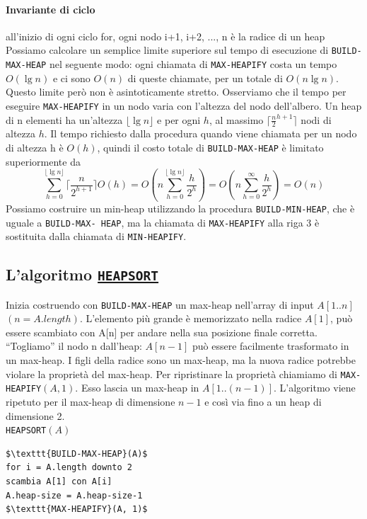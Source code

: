 \documentclass[11pt,a4paper]{article}
\begin{document}
\paragraph{Invariante di ciclo} all’inizio di ogni ciclo for, ogni nodo i+1, i+2, ..., n è la radice
di un heap\medskip\\
%
Possiamo calcolare un semplice limite superiore sul tempo di esecuzione di \texttt{BUILD-MAX-HEAP} nel seguente
modo: ogni chiamata di \texttt{MAX-HEAPIFY} costa un tempo $O(\lg n)$ e ci sono $O(n)$ di queste chiamate, per un totale
di $O(n \lg n)$. Questo limite però non è asintoticamente stretto.
Osserviamo che il tempo per eseguire \texttt{MAX-HEAPIFY} in un nodo varia con l’altezza del nodo dell’albero. Un
heap di n elementi ha un’altezza $\lfloor\lg n\rfloor$ e per ogni $h$, al massimo $\lceil \frac{n}{2}^{h+1} \rceil$ nodi di altezza $h$. Il tempo richiesto
dalla procedura quando viene chiamata per un nodo di altezza h è $O(h)$, quindi il costo totale di \texttt{BUILD-MAX-HEAP} è limitato superiormente da
\[\sum^{\lfloor \lg n \rfloor}_{h=0} \lceil \frac{n}{2^{h+1}} \rceil O(h) = O (n \sum^{\lfloor \lg n \rfloor}_{h=0} \frac{h}{2^h}) = O (n \sum^\infty_{h=0} \frac{h}{2^h}) = O(n)\]
%
Possiamo costruire un min-heap utilizzando la procedura \texttt{BUILD-MIN-HEAP}, che è uguale a \texttt{BUILD-MAX-
HEAP}, ma la chiamata di \texttt{MAX-HEAPIFY} alla riga 3 è sostituita dalla chiamata di \texttt{MIN-HEAPIFY}.

\subsection{L’algoritmo \href{https://cdn-images-1.medium.com/max/1600/1*LVcbTeL6zPLfDHiQ2w3Jtw.gif}{\texttt{HEAPSORT}}}
Inizia costruendo con \texttt{BUILD-MAX-HEAP} un max-heap nell’array di input $A[1..n]$ $(n=A.length)$. L’elemento più
grande è memorizzato nella radice $A[1]$, può essere scambiato con A[n] per andare nella sua posizione finale
corretta. “Togliamo” il nodo n dall’heap: $A[n-1]$ può essere facilmente trasformato in un max-heap. I figli della
radice sono un max-heap, ma la nuova radice potrebbe violare la proprietà del max-heap. Per ripristinare la
proprietà chiamiamo di \texttt{MAX-HEAPIFY}$(A, 1)$. Esso lascia un max-heap in $A[1.. (n-1)]$. L’algoritmo viene ripetuto
per il max-heap di dimensione $n-1$ e così via fino a un heap di dimensione 2.\medskip\medskip\\
%
\texttt{HEAPSORT}$(A)$
\begin{lstlisting}[mathescape=true]
$\texttt{BUILD-MAX-HEAP}(A)$
for i = A.length downto 2
scambia A[1] con A[i]
A.heap-size = A.heap-size-1
$\texttt{MAX-HEAPIFY}(A, 1)$
\end{lstlisting}
\end{document}
